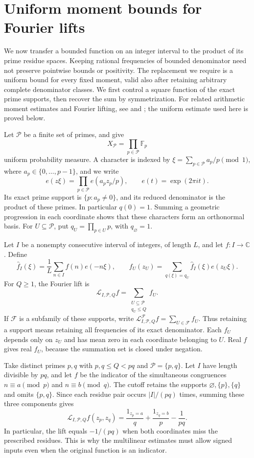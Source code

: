 \section{Uniform moment bounds for Fourier lifts}
\label{sec:lift-moments}

We now transfer a bounded function on an integer interval to the product
of its prime residue spaces.  Keeping rational frequencies of bounded
denominator need not preserve pointwise bounds or positivity.  The
replacement we require is a uniform bound for every fixed moment, valid
also after retaining arbitrary complete denominator classes.  We first
control a square function of the exact prime supports, then recover the
sum by symmetrization. For related arithmetic moment estimates and Fourier
lifting, see \cite[Theorem~2 of the arXiv version]{BloomMaynard2022} and
\cite[Section~3]{GreenSawhney2025}; the uniform estimate used here is
proved below.

Let \(\mathcal P\) be a finite set of primes, and give
\[
 X_{\mathcal P}=\prod_{p\in\mathcal P}\mathbb F_p
\]
uniform probability measure.  A character is indexed by
\(\xi=\sum_{p\in\mathcal P}a_p/p\pmod1\), where
\(a_p\in\{0,\ldots,p-1\}\), and we write
\[
 e(z\xi)=\prod_{p\in\mathcal P}e(a_pz_p/p),
 \qquad e(t)=\exp(2\pi i t).
\]
Its exact prime support is \(\{p:a_p\ne0\}\), and its reduced
denominator is the product of these primes.  In particular \(q(0)=1\).
Summing a geometric progression in each coordinate shows that these
characters form an orthonormal basis.
For \(U\subseteq\mathcal P\), put \(q_U=\prod_{p\in U}p\), with
\(q_\varnothing=1\).

Let \(I\) be a nonempty consecutive interval of integers, of length
\(L\), and let \(f:I\to\mathbb C\).  Define
\[
 \widehat f_I(\xi)=\frac1L\sum_{n\in I}f(n)e(-n\xi),
 \qquad
 f_U(z_U)=\sum_{q(\xi)=q_U}\widehat f_I(\xi)e(z_U\xi).
\]
For \(Q\ge1\), the Fourier lift is
\[
 \mathcal L_{I,\mathcal P,Q}f
   =\sum_{\substack{U\subseteq\mathcal P\\q_U\le Q}}f_U.
\]
If \(\mathcal F\) is a subfamily of these supports, write
\(\mathcal L^{\mathcal F}_{I,\mathcal P,Q}f=\sum_{U\in\mathcal F}f_U\).
Thus retaining a support means retaining all frequencies of its exact
denominator.  Each \(f_U\) depends only on \(z_U\) and has mean zero
in each coordinate belonging to \(U\).  Real \(f\) gives real
\(f_U\), because the summation set is closed under negation.

\begin{remark}
Take distinct primes $p,q$ with $p,q\le Q<pq$ and
$\mathcal P=\{p,q\}$. Let $I$ have length divisible by $pq$, and let
$f$ be the indicator of the simultaneous congruences
$n\equiv a\pmod p$ and $n\equiv b\pmod q$. The cutoff retains the
supports $\varnothing,\{p\},\{q\}$ and omits $\{p,q\}$. Since each
residue pair occurs $|I|/(pq)$ times, summing these three components gives
\[
 \mathcal L_{I,\mathcal P,Q}f(z_p,z_q)
 =\frac{1_{z_p=a}}q+\frac{1_{z_q=b}}p-\frac1{pq}.
\]
In particular, the lift equals $-1/(pq)$ when both coordinates miss the
prescribed residues. This is why the multilinear estimates must allow
signed inputs even when the original function is an indicator.
\end{remark}

